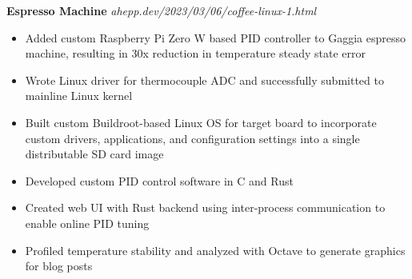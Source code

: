 \noindent \textbf{Espresso Machine} \hfill \textit{ahepp.dev/2023/03/06/coffee-linux-1.html}
\begin{itemize}
    \item Added custom Raspberry Pi Zero W based PID controller to Gaggia espresso machine, resulting in 30x reduction in temperature steady state error
    \item Wrote Linux driver for thermocouple ADC and successfully submitted to mainline Linux kernel
    \item Built custom Buildroot-based Linux OS for target board to incorporate custom drivers, applications, and configuration settings into a single distributable SD card image
    \item Developed custom PID control software in C and Rust
    \item Created web UI with Rust backend using inter-process communication to enable online PID tuning
    \item Profiled temperature stability and analyzed with Octave to generate graphics for blog posts
\end{itemize}
